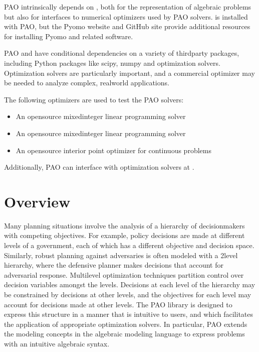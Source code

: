 \documentclass[letterpaper,10pt,english]{sphinxmanual}
\begin{document}
PAO intrinsically depends on ,
both for the representation of algebraic problems but also for
interfaces to numerical optimizers used by PAO solvers.   is installed with PAO, but the Pyomo
website  and GitHub site  provide additional
resources for installing Pyomo and related software.

PAO and  have conditional
dependencies on a variety of third\sphinxhyphen{}party packages, including Python
packages like scipy, numpy and optimization solvers.  Optimization solvers
are particularly important, and a commercial optimizer may be needed to
analyze complex, real\sphinxhyphen{}world applications.

The following optimizers are used to test the PAO solvers:
\begin{itemize}
\item {} 
 \sphinxhyphen{} An open\sphinxhyphen{}source mixed\sphinxhyphen{}integer linear programming solver

\item {} 
 \sphinxhyphen{} An open\sphinxhyphen{}source mixed\sphinxhyphen{}integer linear programming solver

\item {} 
 \sphinxhyphen{} An open\sphinxhyphen{}source interior point optimizer for continuous problems

\end{itemize}

Additionally, PAO can interface with optimization solvers at .


\section{Overview}
\label{\detokenize{overview:overview}}\label{\detokenize{overview::doc}}
Many planning situations involve the analysis of a hierarchy of
decision\sphinxhyphen{}makers with competing objectives.  For example, policy decisions
are made at different levels of a government, each of which has a
different objective and decision space.  Similarly, robust planning
against adversaries is often modeled with a 2\sphinxhyphen{}level hierarchy, where
the defensive planner makes decisions that account for adversarial
response.  Multilevel optimization techniques partition control over
decision variables amongst the levels.  Decisions at each level of
the hierarchy may be constrained by decisions at other levels, and the
objectives for each level may account for decisions made at other levels.
The PAO library is designed to express this structure in a manner that is
intuitive to users, and which facilitates the application of appropriate
optimization solvers.  In particular, PAO extends the modeling concepts
in the  algebraic modeling
language to express problems with an intuitive algebraic syntax.
\end{document}
